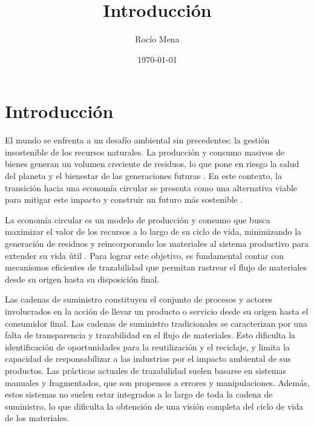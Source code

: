 \documentclass[main.tex]{subfiles}
\title{Introducción}
\author{Rocío Mena}
\date{\today}
\begin{document}
\maketitle

\section{Introducción}

El mundo se enfrenta a un desafío ambiental sin precedentes: la gestión insostenible de los recursos naturales. La producción y consumo masivos de bienes generan un volumen creciente de residuos, lo que pone en riesgo la salud del planeta y el bienestar de las generaciones futuras \cite{IPCC2022, pelegri2021ipcc}. En este contexto, la transición hacia una economía circular se presenta como una alternativa viable para mitigar este impacto y construir un futuro más sostenible \cite{clima2022book}.

La economía circular es un modelo de producción y consumo que busca maximizar el valor de los recursos a lo largo de su ciclo de vida, minimizando la generación de residuos y reincorporando los materiales al sistema productivo para extender su vida útil \cite{da2022economia, melendez2021economia}. Para lograr este objetivo, es fundamental contar con mecanismos eficientes de trazabilidad que permitan rastrear el flujo de materiales desde su origen hasta su disposición final.

Las cadenas de suministro constituyen el conjunto de procesos y actores involucrados en la acción de llevar un producto o servicio desde su origen hasta el consumidor final. Las cadenas de suministro tradicionales se caracterizan por una falta de transparencia y trazabilidad en el flujo de materiales. Esto dificulta la identificación de oportunidades para la reutilización y el reciclaje, y limita la capacidad de responsabilizar a las industrias por el impacto ambiental de sus productos. Las prácticas actuales de trazabilidad suelen basarse en sistemas manuales y fragmentados, que son propensos a errores y manipulaciones. Además, estos sistemas no suelen estar integrados a lo largo de toda la cadena de suministro, lo que dificulta la obtención de una visión completa del ciclo de vida de los materiales.
\end{document}
